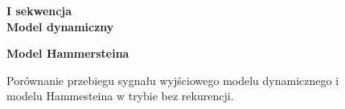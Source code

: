 \documentclass[a4paper,titlepage,11pt,floatssmall]{mwrep}
\begin{document}
\begin{figure}[p!]

\begin{center}
\Large \textbf{I sekwencja} \\
\vspace{0.5cm}
\Large \textbf{Model dynamiczny}
\end{center}

\centering
{}
\hfill
{}

\begin{center}
\Large \textbf{Model Hammersteina}
\end{center}

\hfill
{}
\caption{Porównanie przebiegu sygnału wyjściowego modelu dynamicznego i modelu Hammesteina w trybie bez rekurencji.}
\end{figure}
\end{document}
